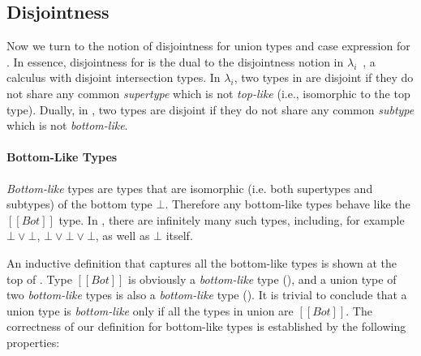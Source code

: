 \subsection{Disjointness}
\label{sec:union:disj}
Now we turn to the notion of disjointness for
union types and case expression for \cal. In essence, disjointness for \cal is
the dual to the disjointness notion in $\lambda_i$~\cite{oliveira2016disjoint},
a calculus with disjoint intersection types.
In $\lambda_i$, two
types in are disjoint if they do not share any common
\emph{supertype} which is not \emph{top-like} (i.e., isomorphic to the top type). Dually, in
\cal, two types are disjoint if they do not share any common \emph{subtype} which
is not \emph{bottom-like}.

\paragraph{Bottom-Like Types}
\emph{Bottom-like} types are types that are isomorphic (i.e.
both supertypes and subtypes) of the bottom type $\bot$. Therefore
any bottom-like types behave like the $[[Bot]]$ type.
In \name, there
are infinitely many such types, including, for example $\bot \lor \bot$,
$\bot \lor \bot \lor \bot$, as well as $\bot$ itself.

An inductive definition that captures all the bottom-like types
is shown at the top of .
Type $[[Bot]]$ is obviously a \emph{bottom-like} type
(), and a union type of two \emph{bottom-like} types is also
a \emph{bottom-like} type ().  It is trivial to conclude
that a union type is \emph{bottom-like} only if all the
types in union are $[[Bot]]$. The correctness of our definition for
bottom-like types is established by the following properties:


